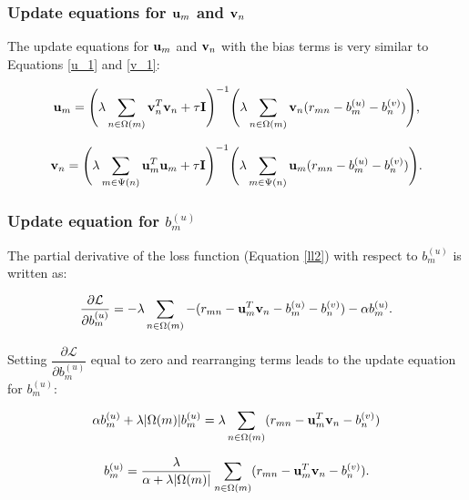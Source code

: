 \documentclass{article}
\begin{document}
\subsubsection{Update equations for $\vb{u}_{m}$ and $\vb{v}_{n}$}

The update equations for $\vb{u}_m$ and $\vb{v}_n$ with the bias terms is very similar to Equations \ref{u_1} and \ref{v_1}:

\begin{equation}
    \begin{split}
        \vb{u}_m = \Bigg(\lambda \sum\limits_{n \in \Omega(m)} \vb{v}_{n}^{T}\vb{v}_{n} + \tau \vb{I} \Bigg)^{-1}
        \Bigg(\lambda \sum\limits_{n \in \Omega(m)} \vb{v}_{n}(r_{mn} - b_{m}^{(u)} - b_{n}^{(v)})\Bigg)\text{,}
    \end{split}
\end{equation}

\begin{equation}
    \begin{split}
        \vb{v}_n = \Bigg(\lambda \sum\limits_{m \in \Psi(n)} \vb{u}_{m}^{T}\vb{u}_{m} + \tau \vb{I} \Bigg)^{-1}
        \Bigg(\lambda \sum\limits_{m \in \Psi(n)} \vb{u}_{m}(r_{mn} - b_{m}^{(u)} - b_{n}^{(v)})\Bigg)\text{.}
    \end{split}
\end{equation}

\subsubsection{Update equation for $b_{m}^{(u)}$}

The partial derivative of the loss function (Equation \ref{ll2}) with respect to $b_{m}^{(u)}$ is written as:

\[
    \dfrac{\partial \mathcal{L}}{\partial b_{m}^{(u)}} 
    = -\lambda \sum\limits_{n \in \Omega(m)} -(r_{mn} - \vb{u}_{m}^{T} \vb{v}_{n} - b_{m}^{(u)} - b_{n}^{(v)}) - \alpha b_{m}^{(u)}\text{.}
\]

Setting $\dfrac{\partial \mathcal{L}}{\partial b_{m}^{(u)}}$ equal to zero and rearranging terms leads to the update equation for $b_{m}^{(u)}$:

\[
    \alpha b_{m}^{(u)} + \lambda |\Omega(m)| b_{m}^{(u)} = \lambda \sum\limits_{n \in \Omega(m)} (r_{mn} - \vb{u}_{m}^{T} \vb{v}_{n} - b_{n}^{(v)})
\]

\begin{equation}
    \begin{split}
        b_{m}^{(u)} = \dfrac{\lambda}{\alpha + \lambda |\Omega(m)|} \sum\limits_{n \in \Omega(m)} (r_{mn} - \vb{u}_{m}^{T} \vb{v}_{n} - b_{n}^{(v)})\text{.}
    \end{split}
\end{equation}
\end{document}
